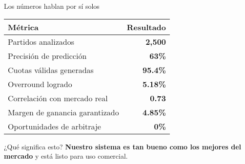 \documentclass[aspectratio=169]{beamer}
\begin{document}
\begin{frame}{Los números hablan por sí solos}
\begin{center}
\large
\begin{tabular}{lr}
\toprule
\textbf{Métrica} & \textbf{Resultado} \\
\midrule
Partidos analizados & \textcolor{azulprincipai}{\textbf{2,500}} \\
Precisión de predicción & \textcolor{verdepositivo}{\textbf{63\%}} \\
Cuotas válidas generadas & \textcolor{verdepositivo}{\textbf{95.4\%}} \\
Overround logrado & \textcolor{azulprincipai}{\textbf{5.18\%}} \\
Correlación con mercado real & \textcolor{verdepositivo}{\textbf{0.73}} \\
Margen de ganancia garantizado & \textcolor{rojocomplementario}{\textbf{4.85\%}} \\
Oportunidades de arbitraje & \textcolor{verdepositivo}{\textbf{0\%}} \\
\bottomrule
\end{tabular}
\end{center}

\vspace{0.5cm}
\begin{alertblock}{¿Qué significa esto?}
\textbf{Nuestro sistema es tan bueno como los mejores del mercado} y está listo para uso comercial.
\end{alertblock}
\end{frame}
\end{document}
